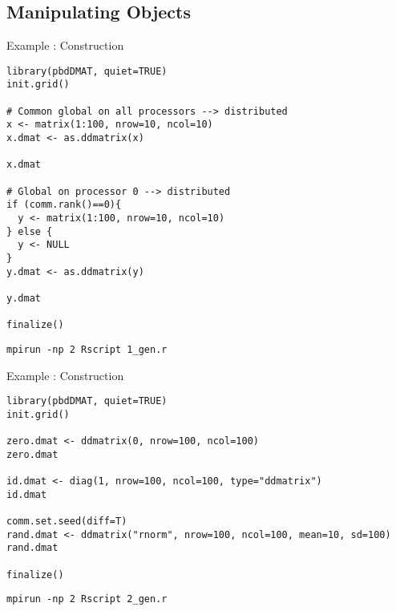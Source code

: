 \subsection{Manipulating  Objects}
\makesubcontentsslidessec


\begin{frame}
  \begin{exampleblock}{Example \countex:   Construction}\pause
\begin{lstlisting}[title=Generate a global matrix and distribute it]
library(pbdDMAT, quiet=TRUE)
init.grid()

# Common global on all processors --> distributed
x <- matrix(1:100, nrow=10, ncol=10)
x.dmat <- as.ddmatrix(x)

x.dmat

# Global on processor 0 --> distributed
if (comm.rank()==0){
  y <- matrix(1:100, nrow=10, ncol=10)
} else {
  y <- NULL
}
y.dmat <- as.ddmatrix(y)

y.dmat

finalize()
\end{lstlisting}
\begin{lstlisting}[basicstyle=\tiny,backgroundcolor=\color{white},keywordstyle=\color{black},
title=\fontsize{6pt}{7.2}\selectfont Execute this script via:]
mpirun -np 2 Rscript 1_gen.r
\end{lstlisting} 
  \end{exampleblock}
\end{frame}



\begin{frame}[fragile]
  \begin{exampleblock}{Example \countex:   Construction}\pause
\begin{lstlisting}[title=Generate locally only what is needed]
library(pbdDMAT, quiet=TRUE)
init.grid()

zero.dmat <- ddmatrix(0, nrow=100, ncol=100)
zero.dmat

id.dmat <- diag(1, nrow=100, ncol=100, type="ddmatrix")
id.dmat

comm.set.seed(diff=T)
rand.dmat <- ddmatrix("rnorm", nrow=100, ncol=100, mean=10, sd=100)
rand.dmat

finalize()
\end{lstlisting}
\begin{lstlisting}[basicstyle=\tiny,backgroundcolor=\color{white},keywordstyle=\color{black},
title=\fontsize{6pt}{7.2}\selectfont Execute this script via:]
mpirun -np 2 Rscript 2_gen.r
\end{lstlisting} 
  \end{exampleblock}
\end{frame}


